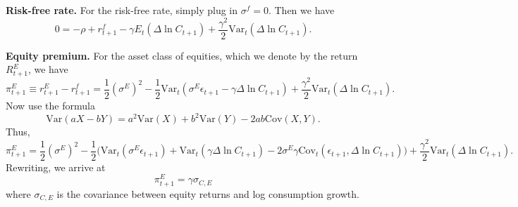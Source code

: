 \documentclass[11pt]{extarticle}
\theoremstyle{plain}
\theoremstyle{definition}
\begin{document}
\vspace{5mm}
\noindent
\textbf{Risk-free rate.} For the risk-free rate, simply plug in $\sigma^f = 0$. Then we have 
\begin{equation}
	0 =  - \rho + r_{t+1}^f - \gamma E_t(\Delta \ln C_{t+1}) + \frac{\gamma^2}{2} \text{Var}_t( \Delta \ln C_{t+1}).
\end{equation}


\vspace{5mm}
\noindent
\textbf{Equity premium.} For the asset class of equities, which we denote by the return $R_{t+1}^E$, we have 
\begin{equation*}
	\pi_{t+1}^E \equiv r_{t+1}^E - r_{t+1}^f = \frac{1}{2} (\sigma^E)^2 - \frac{1}{2} \text{Var}_t( \sigma^E \epsilon_{t+1} - \gamma \Delta \ln C_{t+1}) + \frac{\gamma^2}{2} \text{Var}_t( \Delta \ln C_{t+1}).
\end{equation*}
Now use the formula 
\begin{equation*}
	\text{Var}(aX-bY) = a^2 \text{Var}(X) + b^2 \text{Var}(Y) - 2ab \text{Cov}(X,Y).
\end{equation*}
Thus, 
\begin{equation*}
	\pi_{t+1}^E = \frac{1}{2} (\sigma^E)^2 - \frac{1}{2} \bigg(\text{Var}_t( \sigma^E \epsilon_{t+1}) + \text{Var}_t(\gamma \Delta \ln C_{t+1}) - 2 \sigma^E \gamma \text{Cov}_t(\epsilon_{t+1}, \Delta \ln C_{t+1}) \bigg) + \frac{\gamma^2}{2} \text{Var}_t( \Delta \ln C_{t+1}).
\end{equation*}
Rewriting, we arrive at 
\begin{equation}
	\pi_{t+1}^E = \gamma \sigma_{C,E}
\end{equation}
where $\sigma_{C,E}$ is the covariance between equity returns and log consumption growth. 
\end{document}
